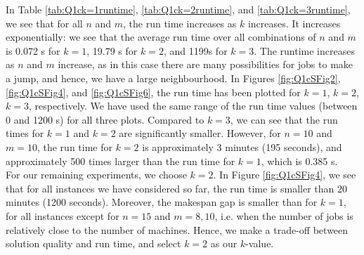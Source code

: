 \documentclass[12pt,a4paper,reqno]{article}
\begin{document}
In Table  \ref{tab:Q1ck=1runtime}, \ref{tab:Q1ck=2runtime}, and \ref{tab:Q1ck=3runtime}, we see that for all $n$ and $m$, the run time increases as $k$ increases. It increases exponentially: we see that the average run time over all combinations of $n$ and $m$ is 0.072 s for $k=1$, 19.79 s for $k=2$, and 1199s for $k=3$. The runtime increases as $n$ and $m$ increase, as in this case there are many possibilities for jobs to make a jump, and hence, we have a large neighbourhood. In Figures \ref{fig:Q1cSFig2}, \ref{fig:Q1cSFig4}, and \ref{fig:Q1cSFig6}, the run time has been plotted for $k=1$, $k=2$, $k=3$, respectively. We have used the same range of the run time values (between 0 and 1200 s) for all three plots. Compared to $k=3$, we can see that the run times for $k=1$ and $k=2$ are significantly smaller. However, for $n=10$ and $m=10$, the run time for $k=2$ is approximately 3 minutes (195 seconds), and approximately 500 times larger than the run time for $k=1$, which is 0.385 s.   \\

For our remaining experiments, we choose $k=2$. In Figure \ref{fig:Q1cSFig4}, we see that for all instances we have considered so far, the run time is smaller than 20 minutes (1200 seconds). Moreover, the makespan gap is smaller than for $k=1$, for all instances except for $n=15$ and $m=8,10$, i.e. when the number of jobs is relatively close to the number of machines. Hence, we make a trade-off between solution quality and run time, and select $k=2$ as our $k$-value.
\end{document}
